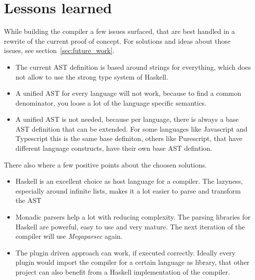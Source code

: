 \section{Lessons learned}

While building the compiler a few issues surfaced, that are best handled in a rewrite of the current proof of concept. For solutions and ideas about those issues, see section~\ref{sec:future_work}.

\begin{itemize}

\item{The current AST definition is based around strings for everything, which does not allow to use the strong type system of Haskell.}

\item{A unified AST for every language will not work, because to find a common denominator, you loose a lot of the language specific semantics.}

\item{A unified AST is not needed, because per language, there is always a base AST definition that can be extended. For some languages like Javascript and Typescript this is the same base definiton, others like Purescript, that have different language constructs, have their own base AST defintion.}

\end{itemize}

There also where a few positive points about the choosen solutions.

\begin{itemize}

\item{Haskell is an excellent choice as host language for a compiler. The lazyness, especially around infinite lists, makes it a lot easier to parse and transform the AST}

\item{Monadic parsers help a lot with reducing complexity. The parsing libraries for Haskell are powerful, easy to use and very mature. The next iteration of the compiler will use \textit{Megaparsec} again.}

\item{The plugin driven approach can work, if executed correctly. Ideally every plugin would import the compiler for a certain language as library, that other project can also benefit from a Haskell implementation of the compiler.}

\end{itemize}

